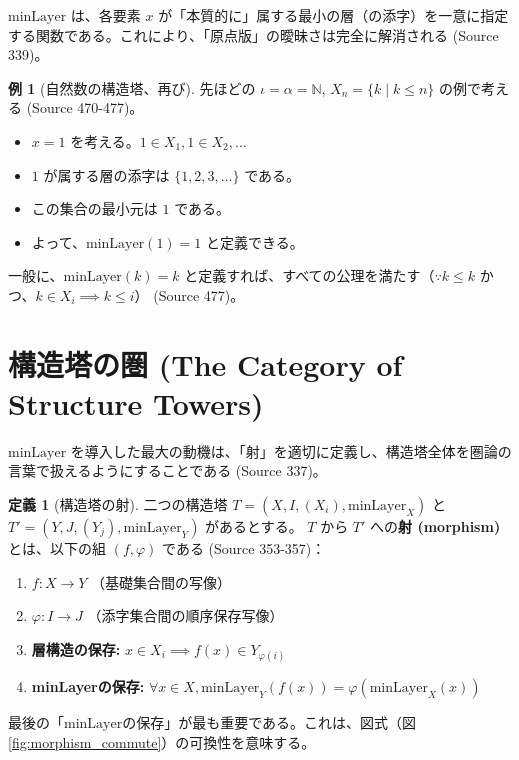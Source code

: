 \documentclass[11pt]{ltjsarticle}
\theoremstyle{definition}
\newtheorem{definition}{定義}[section]
\newtheorem{example}{例}[section]
\theoremstyle{plain}
\theoremstyle{remark}
\begin{document}
$\text{minLayer}$ は、各要素 $x$ が「本質的に」属する最小の層（の添字）を一意に指定する関数である。これにより、「原点版」の曖昧さは完全に解消される (Source 339)。

\begin{example}[自然数の構造塔、再び]
先ほどの $\iota = \alpha = \mathbb{N}$, $X_n = \{k \mid k \le n\}$ の例で考える (Source 470-477)。
\begin{itemize}
    \item $x=1$ を考える。$1 \in X_1, 1 \in X_2, \dots$
    \item $1$ が属する層の添字は $\{1, 2, 3, \dots\}$ である。
    \item この集合の最小元は $1$ である。
    \item よって、$\text{minLayer}(1) = 1$ と定義できる。
\end{itemize}
一般に、$\text{minLayer}(k) = k$ と定義すれば、すべての公理を満たす（$\because k \le k$ かつ、$k \in X_i \implies k \le i$） (Source 477)。
\end{example}

\section{構造塔の圏 (The Category of Structure Towers)}

$\text{minLayer}$ を導入した最大の動機は、「射」を適切に定義し、構造塔全体を圏論の言葉で扱えるようにすることである (Source 337)。

\begin{definition}[構造塔の射]
二つの構造塔 $T = (X, I, (X_i), \text{minLayer}_X)$ と $T' = (Y, J, (Y_j), \text{minLayer}_Y)$ があるとする。
$T$ から $T'$ への\textbf{射 (morphism)} とは、以下の組 $(f, \varphi)$ である (Source 353-357)：
\begin{enumerate}
    \item $f : X \to Y$ （基礎集合間の写像）
    \item $\varphi : I \to J$ （添字集合間の順序保存写像）
    \item \textbf{層構造の保存:} $x \in X_i \implies f(x) \in Y_{\varphi(i)}$
    \item \textbf{minLayerの保存:} $\forall x \in X, \text{minLayer}_Y(f(x)) = \varphi(\text{minLayer}_X(x))$
\end{enumerate}
\end{definition}

最後の「$\text{minLayer}$の保存」が最も重要である。これは、図式（図\ref{fig:morphism_commute}）の可換性を意味する。
\end{document}
